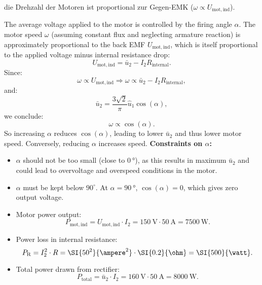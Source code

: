 \begin{germanhintblock}
    die Drehzahl der Motoren ist proportional zur Gegen-EMK ($ \omega \propto U_\mathrm{mot,ind} $).
\end{germanhintblock}
\begin{solutionblock}
The average voltage applied to the motor is controlled by the firing angle $\alpha $. The motor speed 
$\omega $ (assuming constant flux and neglecting armature reaction) is approximately proportional to the 
back EMF $U_\mathrm{mot,ind}$, which is itself proportional to the applied voltage minus internal resistance drop:
$$ U_\mathrm{mot,ind} = \bar{u}_\mathrm{2} - I_\mathrm{2} R_\mathrm{internal}.$$
Since:
$$ \omega \propto U_\mathrm{mot,ind} \Rightarrow \omega \propto \bar{u}_\mathrm{2} - I_\mathrm{2} R_\mathrm{internal}, $$
and:
$$ \bar{u}_\mathrm{2} = \frac{3\sqrt{2}}{\pi} \hat{u}_\mathrm{1} \cos(\alpha), $$
we conclude:
$$ \omega \propto \cos(\alpha).$$
So increasing $ \alpha $ reduces $ \cos(\alpha) $, leading to lower $\bar{u}_\mathrm{2}$ and thus lower motor 
speed. Conversely, reducing $ \alpha $ increases speed.
\vspace{0.3em}
\textbf{Constraints on $\alpha$:}
\begin{itemize}
    \item $\alpha$ should not be too small (close to $ \SI{0}{\degree} $), as this results in maximum 
    $\bar{u}_\mathrm{2}$ and could lead to overvoltage and overspeed conditions in the motor.
    \item $\alpha$ must be kept below $ 90^\circ $. At $ \alpha = \SI{90}{\degree} $, $ \cos(\alpha) = 0 $, 
    which gives zero output voltage.
\end{itemize}
\end{solutionblock}
\begin{solutionblock}
 \begin{itemize}
        \item Motor power output:
        $$ P_\mathrm{mot,ind} = U_\mathrm{mot,ind} \cdot I_\mathrm{2} = \SI{150}{\volt} \cdot \SI{50}{\ampere} = \SI{7500}{\watt}. $$
        \item Power loss in internal resistance:
        $$ P_\mathrm{R} = I^2_\mathrm{2} \cdot R = \SI{50^2}{\ampere^2} \cdot \SI{0.2}{\ohm} = \SI{500}{\watt}. $$
        \item Total power drawn from rectifier:
        $$ P_\mathrm{total} = \bar{u}_\mathrm{2} \cdot I_\mathrm{2} = \SI{160}{\volt} \cdot \SI{50}{\ampere} = \SI{8000}{\watt}. $$
    \end{itemize}
\end{solutionblock}
